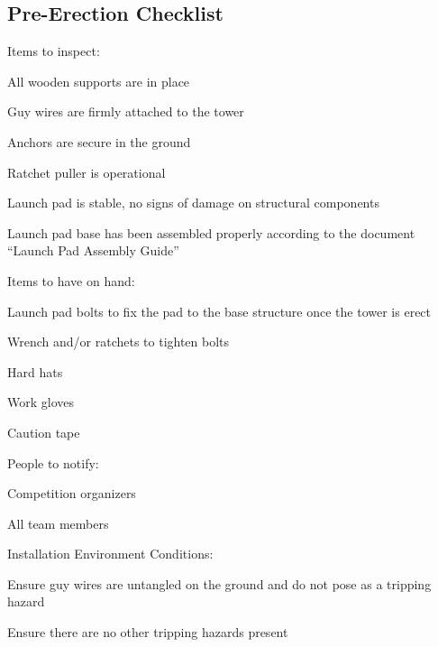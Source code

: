 \subsection{Pre-Erection Checklist}
\begin{checklist}[label=$\bullet$]
    \item Items to inspect:
    \begin{checklist}
        \item All wooden supports are in place
        \item Guy wires are firmly attached to the tower
        \item Anchors are secure in the ground
        \item Ratchet puller is operational
        \item Launch pad is stable, no signs of damage on structural components
        \item Launch pad base has been assembled properly according to the document “Launch Pad Assembly Guide”
    \end{checklist}

    \item Items to have on hand:
    \begin{checklist}
        \item Launch pad bolts to fix the pad to the base structure once the tower is erect
        \item Wrench and/or ratchets to tighten bolts
        \item Hard hats
        \item Work gloves
        \item Caution tape
    \end{checklist}

    \item People to notify:
    \begin{checklist}
        \item Competition organizers
        \item All team members
    \end{checklist}

    \item Installation Environment Conditions:
    \begin{checklist}
        \item Ensure guy wires are untangled on the ground and do not pose as a tripping hazard
        \item Ensure there are no other tripping hazards present
    \end{checklist}


\end{checklist}
